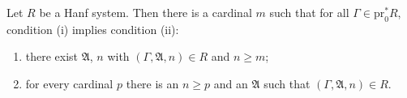 Let $R$ be a Hanf system. Then there is a cardinal $m$ such that for all $\Gamma \in \mathrm{pr}_0^* R$, condition (i) implies condition (ii):

\begin{enumerate}
\item[(i)] there exist $\mathfrak{A}$, $n$ with $(\Gamma, \mathfrak{A}, n) \in R$ and $n \geq m$;
\item[(ii)] for every cardinal $p$ there is an $n \geq p$ and an $\mathfrak{A}$ such that $(\Gamma, \mathfrak{A}, n) \in R$.
\end{enumerate}

